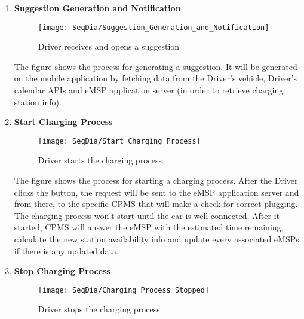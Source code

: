 \begin{enumerate}
        \newpage
        \item \textbf{Suggestion Generation and Notification}
        \begin{figure}[H]
            \begin{center}
            \texttt{[image: SeqDia/Suggestion\_Generation\_and\_Notification]}
            \caption{Driver receives and opens a suggestion}
            \label{fig:Suggestion}
            \end{center}
        \end{figure}
       The figure shows the process for generating a suggestion. It will be generated on the mobile application by fetching data from the Driver's vehicle, Driver's calendar APIs and eMSP application server (in order to retrieve charging station info). 
       \newpage
        \item \textbf{Start Charging Process}
        \begin{figure}[H]
            \begin{center}
            \texttt{[image: SeqDia/Start\_Charging\_Process]}
            \caption{Driver starts the charging process}
            \label{fig:StartCharge}
            \end{center}
        \end{figure}
        The figure shows the process for starting a charging process. After the Driver clicks the button, the request will be sent to the eMSP application server and from there, to the specific CPMS that will make a check for correct plugging. The charging process won't start until the car is well connected. After it started, CPMS will answer the eMSP with the estimated time remaining, calculate the new station availability info and update every associated eMSPs if there is any updated data. 
        \newpage
        \item \textbf{Stop Charging Process}
        \begin{figure}[H]
            \begin{center}
            \texttt{[image: SeqDia/Charging\_Process\_Stopped]}
            \caption{Driver stops the charging process}
            \label{fig:StopCharge}
            \end{center}
        \end{figure}

\end{enumerate}
